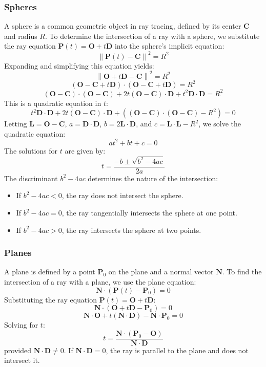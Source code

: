 \documentclass[12pt]{article}
\begin{document}
\subsubsection{Spheres}
A sphere is a common geometric object in ray tracing, defined by its center \(\mathbf{C}\) and radius \(R\). To determine the intersection of a ray with a sphere, we substitute the ray equation \(\mathbf{P}(t) = \mathbf{O} + t\mathbf{D}\) into the sphere's implicit equation:
\[
    \left\| \mathbf{P}(t) - \mathbf{C} \right\|^2 = R^2
\]
Expanding and simplifying this equation yields:
\[
    \left\| \mathbf{O} + t\mathbf{D} - \mathbf{C} \right\|^2 = R^2
\]
\[
    \left( \mathbf{O} - \mathbf{C} + t\mathbf{D} \right) \cdot \left( \mathbf{O} - \mathbf{C} + t\mathbf{D} \right) = R^2
\]
\[
    (\mathbf{O} - \mathbf{C}) \cdot (\mathbf{O} - \mathbf{C}) + 2t \left( \mathbf{O} - \mathbf{C} \right) \cdot \mathbf{D} + t^2 \mathbf{D} \cdot \mathbf{D} = R^2
\]
This is a quadratic equation in \(t\):
\[
    t^2 \mathbf{D} \cdot \mathbf{D} + 2t \left( \mathbf{O} - \mathbf{C} \right) \cdot \mathbf{D} + \left( (\mathbf{O} - \mathbf{C}) \cdot (\mathbf{O} - \mathbf{C}) - R^2 \right) = 0
\]
Letting \(\mathbf{L} = \mathbf{O} - \mathbf{C}\), \(a = \mathbf{D} \cdot \mathbf{D}\), \(b = 2 \mathbf{L} \cdot \mathbf{D}\), and \(c = \mathbf{L} \cdot \mathbf{L} - R^2\), we solve the quadratic equation:
\[
    at^2 + bt + c = 0
\]
The solutions for \(t\) are given by:
\[
    t = \frac{-b \pm \sqrt{b^2 - 4ac}}{2a}
\]
The discriminant \(b^2 - 4ac\) determines the nature of the intersection:
\begin{itemize}
    \item If \(b^2 - 4ac < 0\), the ray does not intersect the sphere.
    \item If \(b^2 - 4ac = 0\), the ray tangentially intersects the sphere at one point.
    \item If \(b^2 - 4ac > 0\), the ray intersects the sphere at two points.
\end{itemize}

\subsubsection{Planes}
A plane is defined by a point \(\mathbf{P}_0\) on the plane and a normal vector \(\mathbf{N}\). To find the intersection of a ray with a plane, we use the plane equation:
\[
    \mathbf{N} \cdot \left( \mathbf{P}(t) - \mathbf{P}_0 \right) = 0
\]
Substituting the ray equation \(\mathbf{P}(t) = \mathbf{O} + t\mathbf{D}\):
\[
    \mathbf{N} \cdot \left( \mathbf{O} + t\mathbf{D} - \mathbf{P}_0 \right) = 0
\]
\[
    \mathbf{N} \cdot \mathbf{O} + t \left( \mathbf{N} \cdot \mathbf{D} \right) - \mathbf{N} \cdot \mathbf{P}_0 = 0
\]
Solving for \(t\):
\[
    t = \frac{\mathbf{N} \cdot (\mathbf{P}_0 - \mathbf{O})}{\mathbf{N} \cdot \mathbf{D}}
\]
provided \(\mathbf{N} \cdot \mathbf{D} \neq 0\). If \(\mathbf{N} \cdot \mathbf{D} = 0\), the ray is parallel to the plane and does not intersect it.
\end{document}
